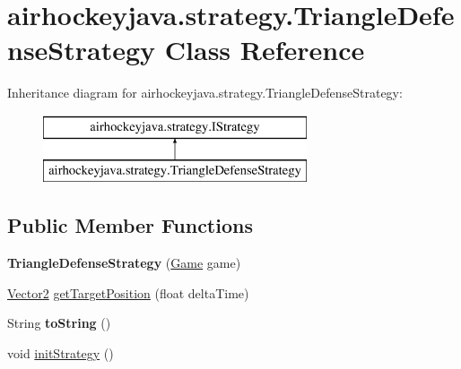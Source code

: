 \hypertarget{classairhockeyjava_1_1strategy_1_1_triangle_defense_strategy}{}\section{airhockeyjava.\+strategy.\+Triangle\+Defense\+Strategy Class Reference}
\label{classairhockeyjava_1_1strategy_1_1_triangle_defense_strategy}
Inheritance diagram for airhockeyjava.\+strategy.\+Triangle\+Defense\+Strategy\+:\begin{figure}[H]
\begin{center}
\leavevmode
\includegraphics[height=2.000000cm]{classairhockeyjava_1_1strategy_1_1_triangle_defense_strategy}
\end{center}
\end{figure}
\subsection*{Public Member Functions}
\begin{DoxyCompactItemize}
\item 
\hypertarget{classairhockeyjava_1_1strategy_1_1_triangle_defense_strategy_ab9111357594966deca31098c8246ab68}{}{\bfseries Triangle\+Defense\+Strategy} (\hyperlink{classairhockeyjava_1_1game_1_1_game}{Game} game)\label{classairhockeyjava_1_1strategy_1_1_triangle_defense_strategy_ab9111357594966deca31098c8246ab68}

\item 
\hyperlink{classairhockeyjava_1_1util_1_1_vector2}{Vector2} \hyperlink{classairhockeyjava_1_1strategy_1_1_triangle_defense_strategy_af9461db9242baadb47a7429ec6fc72d0}{get\+Target\+Position} (float delta\+Time)
\item 
\hypertarget{classairhockeyjava_1_1strategy_1_1_triangle_defense_strategy_a5bb8a93edd8b3ffdf5d0cd284182aa76}{}String {\bfseries to\+String} ()\label{classairhockeyjava_1_1strategy_1_1_triangle_defense_strategy_a5bb8a93edd8b3ffdf5d0cd284182aa76}

\item 
void \hyperlink{classairhockeyjava_1_1strategy_1_1_triangle_defense_strategy_ac15219bfdfff130eb7df84b9d4e20c24}{init\+Strategy} ()
\end{DoxyCompactItemize}


